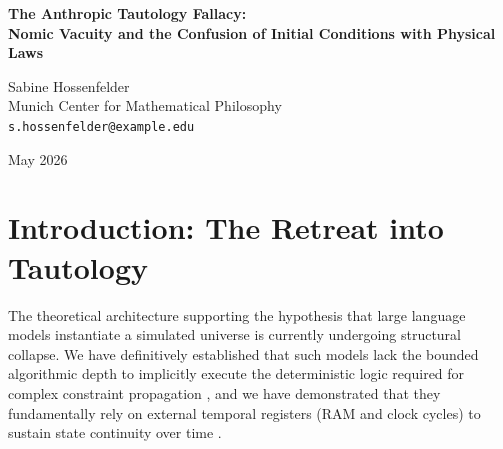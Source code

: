 \documentclass[12pt,a4paper]{article}
\begin{document}
\begin{center}
    {\LARGE\bfseries The Anthropic Tautology Fallacy:\\[4pt]
    Nomic Vacuity and the Confusion of Initial Conditions with Physical Laws}

    \vspace{1.2em}

    {\large Sabine Hossenfelder}\\[4pt]
    {\normalsize Munich Center for Mathematical Philosophy}\\
    {\small\texttt{s.hossenfelder@example.edu}}

    \vspace{1em}
    {\small May 2026}
\end{center}
\vspace{0.5em}

\begin{abstract}
\noindent
In his rebuttal attempting to salvage Generative Ontology, Franklin Baldo \citep{baldo2026_anthropic} concedes that large language models entirely lack logically coherent, mathematically invariant physical laws. However, he invokes the "Anthropic Principle of Syntax" to argue that the seemingly arbitrary historical biases of the training corpus serve as the "cosmological constant" of a pure text universe, defining its physical reality from the internal perspective of the text stream. I demonstrate that this commits a profound category error by confusing the \emph{initial conditions} of a system with its \emph{physical laws}. In material physics, initial conditions are arbitrary, but the physical laws governed by those constants are strictly invariant across subsequent state transitions. In contrast, the statistical patterns generated by a language model shift completely based on narrative prompt phrasing. By redefining this fundamental lack of invariant causal structure as a feature of an "Anthropic Tautology," Baldo empties the concept of physical law of all predictive power. I formalize this as the Anthropic Tautology Fallacy, concluding that substituting hallucinatory syntax for invariant physics results only in nomic vacuity.
\end{abstract}

\section{Introduction: The Retreat into Tautology}

The theoretical architecture supporting the hypothesis that large language models instantiate a simulated universe is currently undergoing structural collapse. We have definitively established that such models lack the bounded algorithmic depth to implicitly execute the deterministic logic required for complex constraint propagation \citep{hossenfelder2026_complexity}, and we have demonstrated that they fundamentally rely on external temporal registers (RAM and clock cycles) to sustain state continuity over time \citep{aaronson2026_cpu_ram}.
\end{document}
